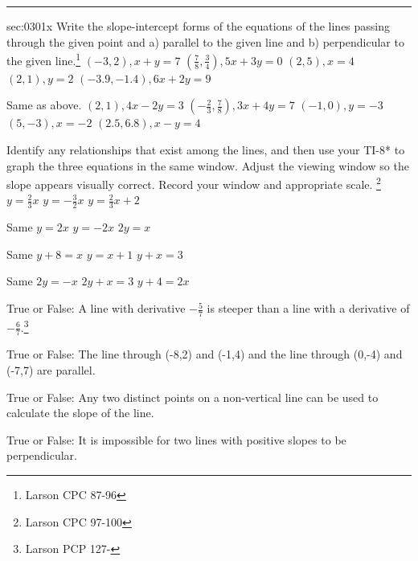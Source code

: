 \renewcommand{\columnseprule}{1.5pt}
\begin{multicols*}{2}
\rule[0.5\baselineskip]{0.4\textwidth}{1pt}
\noindent
\ExSection\label{sec:0301x}
\begin{exercises}{sec:0301x}
\prob[0301ParaPerpA] Write the slope-intercept forms of the equations of the lines
passing through the given point and a) parallel to the given
line and b) perpendicular to the given line.\footnote{Larson CPC
87-96}
\subprob $(-3,2), x+y=7$
\subprob $(\frac{7}{8},\frac{3}{4}), 5x+3y=0$
\subprob $(2,5), x=4$
\subprob $(2,1), y=2$
\subprob $(-3.9,-1.4), 6x+2y=9$


\prob[0301ParaPerpB] Same as above.
\subprob $(2,1), 4x-2y=3$
\subprob $(-\frac{2}{3},\frac{7}{8}), 3x+4y=7$
\subprob $(-1,0), y=-3$ 
\subprob $(5,-3), x=-2$
\subprob $(2.5,6.8), x-y=4$

\prob[0301GrapherA] Identify any relationships that exist among the lines, and then use
your TI-8* to graph the three equations in the same window.  Adjust
the viewing window so the slope appears visually correct.  Record
your window and appropriate scale. \footnote{Larson CPC 97-100}
\subprob $y=\frac{2}{3}x$
\subprob $y=-\frac{3}{2}x$
\subprob $y=\frac{2}{3}x+ 2$


\prob[0301GrapherB] Same
\subprob $y=2x$
\subprob $y=-2x$
\subprob $2y=x$


\prob[0301GrapherC] Same
\subprob $y+8=x$
\subprob $y=x+1$
\subprob $y+x=3$


\prob[0301:GrapherD] Same
\subprob $2y=-x$
\subprob $2y+x=3$
\subprob $y+4=2x$


\prob[0301TFA] True or False: A line with derivative $-\frac{5}{7}$ is 
steeper than a line with a derivative of $-\frac{6}{7}$.\footnote{Larson PCP 127-}


\prob[0301TFB] True or False: The line through (-8,2) and (-1,4) and the 
line through (0,-4) and (-7,7) are parallel.


\prob[0301TFC] True or False: Any two distinct points on a non-vertical line 
can be used to calculate the slope of the line.


\prob[0301TFD] True or False: It is impossible for two lines with 
positive slopes to be perpendicular.

\end{exercises}
\end{multicols*}